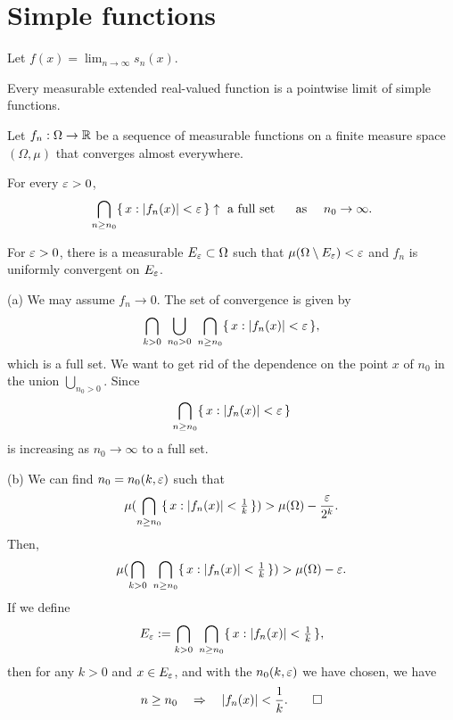 \documentclass{../note}
\begin{document}
\section{Simple functions}
\begin{prb}
\end{prb}
\begin{pf}
Let $f(x)=\lim_{n\to\infty}s_n(x)$.

\end{pf}

Every measurable extended real-valued function is a pointwise limit of simple functions.




\begin{prb}
Let $f_n:\Omega\to\mathbb{R}$ be a sequence of measurable functions on a finite measure space $(\Omega,\mu)$ that converges almost everywhere.
\begin{parts}
\item For every $\varepsilon>0$,
\[\bigcap_{n\ge n_0}\{\,x:|f_n(x)|<\varepsilon\,\}\uparrow\text{ a full set }\quad\text{ as }\quad n_0\to\infty.\]
\item For $\varepsilon>0$, there is a measurable $E_\varepsilon\subset\Omega$ such that $\mu(\Omega\setminus E_\varepsilon)<\varepsilon$ and $f_n$ is uniformly convergent on $E_\varepsilon$.
\end{parts}
\end{prb}
\begin{pf}
(a)
We may assume $f_n\to0$.
The set of convergence is given by
\[\bigcap_{k>0}\ \bigcup_{n_0>0}\ \bigcap_{n\ge n_0}\{\,x:|f_n(x)|<\e\,\},\]
which is a full set.
We want to get rid of the dependence on the point $x$ of $n_0$ in the union $\bigcup_{n_0>0}$.
Since
\[\bigcap_{n\ge n_0}\{\,x:|f_n(x)|<\varepsilon\,\}\]
is increasing as $n_0\to\infty$ to a full set.

(b)
We can find $n_0=n_0(k,\varepsilon)$ such that
\[\mu(\bigcap_{n\ge n_0}\{\,x:|f_n(x)|<\tfrac1k\,\})>\mu(\Omega)-\frac{\varepsilon}{2^k}.\]
Then,
\[\mu(\bigcap_{k>0}\ \bigcap_{n\ge n_0}\{\,x:|f_n(x)|<\tfrac1k\,\})>\mu(\Omega)-\varepsilon.\]
If we define
\[E_\e:=\bigcap_{k>0}\ \bigcap_{n\ge n_0}\{\,x:|f_n(x)|<\tfrac1k\,\},\]
then for any $k>0$ and $x\in E_\varepsilon$, and with the $n_0(k,\varepsilon)$ we have chosen,
we have
\[n\ge n_0\quad\Rightarrow\quad |f_n(x)|<\frac1k.\qedhere\]
\end{pf}
\end{document}
